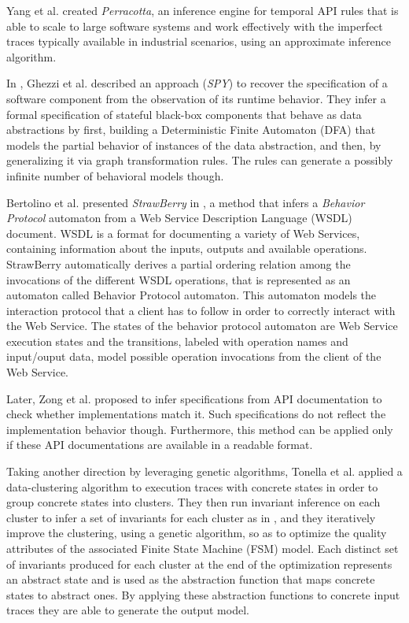 Yang et al. \cite{Yang:2006:PMT:1134285.1134325} created
\textit{Perracotta}, an inference engine for temporal API rules
that is able to scale to large software systems and work
effectively with the imperfect traces typically available in
industrial scenarios, using an approximate inference algorithm.

In \cite{Ghezzi:2009:SIB:1555001.1555057}, Ghezzi et al.
described an approach (\textit{SPY}) to recover the specification
of a software component from the observation of its runtime
behavior. They infer a formal specification of stateful black-box
components that behave as data abstractions by first, building a
Deterministic Finite Automaton (DFA) that models the partial
behavior of instances of the data abstraction, and then, by
generalizing it via graph transformation rules. The rules can
generate a possibly infinite number of behavioral models though.

Bertolino et al. presented \textit{StrawBerry} in
\cite{Bertolino:2009:ASB:1595696.1595719}, a method that infers a
\textit{Behavior Protocol} automaton from a Web Service
Description Language (WSDL) document.  WSDL is a format for
documenting a variety of Web Services, containing information
about the inputs, outputs and available operations. StrawBerry
automatically derives a partial ordering relation among the
invocations of the different WSDL operations, that is represented
as an automaton called Behavior Protocol automaton.  This
automaton models the interaction protocol that a client has to
follow in order to correctly interact with the Web Service.  The
states of the behavior protocol automaton are Web Service
execution states and the transitions, labeled with operation
names and input/ouput data, model possible operation invocations
from the client of the Web Service.

Later, Zong et al. \cite{ZhongZXM11} proposed to infer
specifications from API documentation to check whether
implementations match it.  Such specifications do not reflect the
implementation behavior though. Furthermore, this method can be
applied only if these API documentations are available in a
readable format.

Taking another direction by leveraging genetic algorithms,
Tonella et al. \cite{TonellaNMLH13} applied a data-clustering
algorithm to execution traces with concrete states in order to
group concrete states into clusters. They then run invariant
inference on each cluster to infer a set of invariants for each
cluster as in \cite{Ernst:1999:DDL:302405.302467,Ernst200735},
and they iteratively improve the clustering, using a genetic
algorithm, so as to optimize the quality attributes of the
associated Finite State Machine (FSM) model. Each distinct set of
invariants produced for each cluster at the end of the
optimization represents an abstract state and is used as the
abstraction function that maps concrete states to abstract ones.
By applying these abstraction functions to concrete input traces
they are able to generate the output model.

